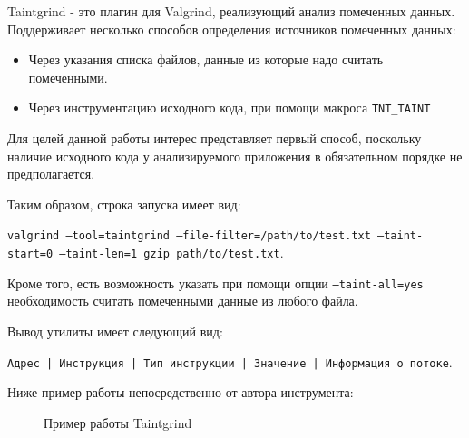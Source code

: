 Taintgrind\cite{Taintgrind} - это плагин для Valgrind, реализующий анализ помеченных данных. Поддерживает несколько способов определения источников помеченных данных:
\begin{itemize}
    \item Через указания списка файлов, данные из которые надо считать помеченными.
    \item Через инструментацию исходного кода, при помощи макроса \texttt{TNT\_TAINT}
\end{itemize}

Для целей данной работы интерес представляет первый способ, поскольку наличие исходного кода у анализируемого приложения в обязательном порядке не предполагается.

Таким образом, строка запуска имеет вид:
\bigskip

        \texttt{valgrind --tool=taintgrind --file-filter=/path/to/test.txt --taint-start=0 --taint-len=1 gzip path/to/test.txt}.

\bigskip
Кроме того, есть возможность указать при помощи опции \texttt{--taint-all=yes} необходимость считать помеченными данные из любого файла.

Вывод утилиты имеет следующий вид:

\mbox{\texttt{Адрес | Инструкция | Тип инструкции | Значение | Информация о потоке}}.

Ниже пример работы непосредственно от автора инструмента:

\begin{figure}[H]
    \caption{Пример работы Taintgrind}
    \label{fig:taintgrind}
\end{figure}

